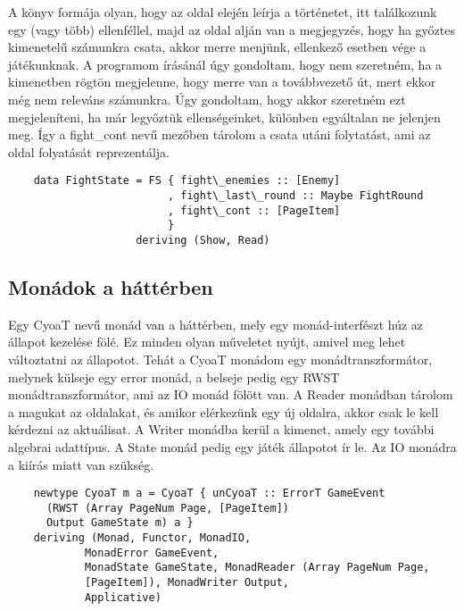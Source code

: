 \documentclass[12pt,a4paper,oneside]{report}
\begin{document}
    A könyv formája olyan, hogy az oldal elején leírja a
    történetet, itt találkozunk egy (vagy több) ellenféllel, majd az
    oldal alján van a megjegyzés, hogy ha győztes kimenetelű
    számunkra csata, akkor merre menjünk, ellenkező esetben vége a
    játékunknak. A programom írásánál úgy gondoltam, hogy nem
    szeretném, ha a kimenetben rögtön megjelenne, hogy merre van a
    továbbvezető út, mert ekkor még nem releváns számunkra. Úgy
    gondoltam, hogy akkor szeretném ezt megjeleníteni, ha már
    legyőztük ellenségeinket, különben egyáltalan ne jelenjen
    meg. Így a fight\_cont nevű mezőben tárolom a csata utáni
    folytatást, ami az oldal folyatását reprezentálja.
    \begin{verbatim}
    data FightState = FS { fight\_enemies :: [Enemy]
                         , fight\_last\_round :: Maybe FightRound
                         , fight\_cont :: [PageItem]
                         }
                    deriving (Show, Read)
    \end{verbatim}
    
    \subsection{Monádok a háttérben}
    Egy CyoaT nevű monád van a háttérben, mely egy monád-interfészt
    húz az állapot kezelése fölé. Ez minden olyan műveletet nyújt,
    amivel meg lehet változtatni az állapotot.  Tehát a CyoaT monádom
    egy monádtranszformátor, melynek külseje egy error monád, a
    belseje pedig egy RWST monádtranszformátor, ami az IO monád fölött
    van. A Reader monádban tárolom a magukat az oldalakat, és amikor
    elérkezünk egy új oldalra, akkor csak le kell kérdezni az
    aktuálisat. A Writer monádba kerül a kimenet, amely egy további
    algebrai adattípus. A State monád pedig egy játék állapotot ír le.
    Az IO monádra a kiírás miatt van szükség.
    \begin{verbatim}
    newtype CyoaT m a = CyoaT { unCyoaT :: ErrorT GameEvent
      (RWST (Array PageNum Page, [PageItem])
      Output GameState m) a }
    deriving (Monad, Functor, MonadIO,
            MonadError GameEvent,
            MonadState GameState, MonadReader (Array PageNum Page,
            [PageItem]), MonadWriter Output,
            Applicative)
    \end{verbatim}
\end{document}
